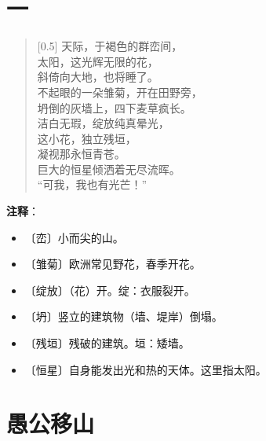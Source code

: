 \documentclass[12pt,UTF-8,openany]{ctexbook}
\begin{document}
\chapter{一}

\begin{normalsize}
    
    \begin{verse}[0.5\linewidth]
        天际，于褐色的群峦间， \\
        太阳，这光辉无限的花， \\
        斜倚向大地，也将睡了。 \\
        不起眼的一朵雏菊，开在田野旁， \\
        坍倒的灰墙上，四下麦草疯长。 \\
        洁白无瑕，绽放纯真晕光， \\
        这小花，独立残垣， \\
        凝视那永恒青苍。 \\
        巨大的恒星倾洒着无尽流晖。 \\
        “可我，我也有光芒！”
    \end{verse}
    
\end{normalsize}


\newpage

\textbf{注释}：

\vspace{-1em}

\begin{itemize}
    \setlength\itemsep{-0.2em}
    \item 〔峦〕小而尖的山。
    \item 〔雏菊〕欧洲常见野花，春季开花。
    \item 〔绽放〕（花）开。绽：衣服裂开。
    \item 〔坍〕竖立的建筑物（墙、堤岸）倒塌。
    \item 〔残垣〕残破的建筑。垣：矮墙。
    \item 〔恒星〕自身能发出光和热的天体。这里指太阳。
\end{itemize}

\chapter{愚公移山}
\end{document}
